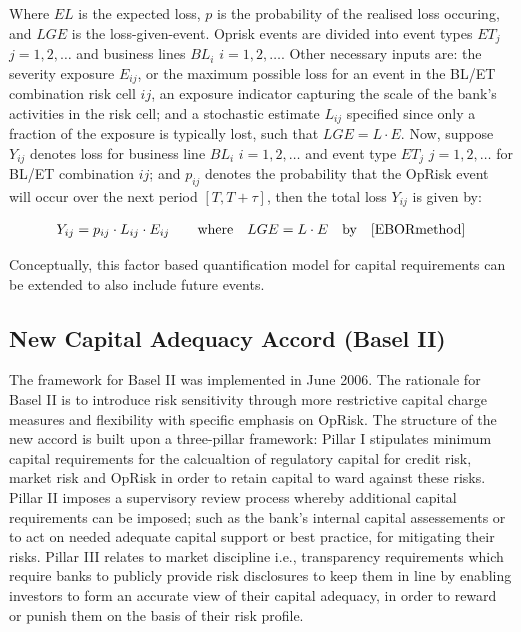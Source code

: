 \documentclass[
]{article}
\begin{document}
Where \(EL\) is the expected loss, \(p\) is the probability of the
realised loss occuring, and \(LGE\) is the loss-given-event. Oprisk
events are divided into event types \(ET_j\) \(j=1,2,\ldots\) and
business lines \(BL_i\) \(i=1,2,\ldots\). Other necessary inputs are:
the severity exposure \(E_{ij}\), or the maximum possible loss for an
event in the BL/ET combination risk cell \(ij\), an exposure indicator
capturing the scale of the bank's activities in the risk cell; and a
stochastic estimate \(L_{ij}\) specified since only a fraction of the
exposure is typically lost, such that \(LGE =L\cdot E\). Now, suppose
\(Y_{ij}\) denotes loss for business line \(BL_i\) \(i=1,2,\ldots\) and
event type \(ET_j\) \(j=1,2,\ldots\) for BL/ET combination \(ij\); and
\(p_{ij}\) denotes the probability that the OpRisk event will occur over
the next period \([T,T+\tau]\), then the total loss \(Y_{ij}\) is given
by:

\singlespacing

\begin{eqnarray}\label{EBORmethodology}
Y_{ij} = p_{ij} \cdot L_{ij} \cdot E_{ij} \qquad \mbox{where} \quad LGE = L \cdot E \quad \mbox{by}\quad \ref{EBORmethod}
\end{eqnarray} \doublespacing

Conceptually, this factor based quantification model for capital
requirements can be extended to also include future events.

\subsection{New Capital Adequacy Accord (Basel II)}

The framework for Basel II was implemented in June 2006. The rationale
for Basel II is to introduce risk sensitivity through more restrictive
capital charge measures and flexibility with specific emphasis on
OpRisk. The structure of the new accord is built upon a three-pillar
framework: Pillar I stipulates minimum capital requirements for the
calcualtion of regulatory capital for credit risk, market risk and
OpRisk in order to retain capital to ward against these risks. Pillar II
imposes a supervisory review process whereby additional capital
requirements can be imposed; such as the bank's internal capital
assessements or to act on needed adequate capital support or best
practice, for mitigating their risks. Pillar III relates to market
discipline i.e., transparency requirements which require banks to
publicly provide risk disclosures to keep them in line by enabling
investors to form an accurate view of their capital adequacy, in order
to reward or punish them on the basis of their risk profile.\medskip
\end{document}
